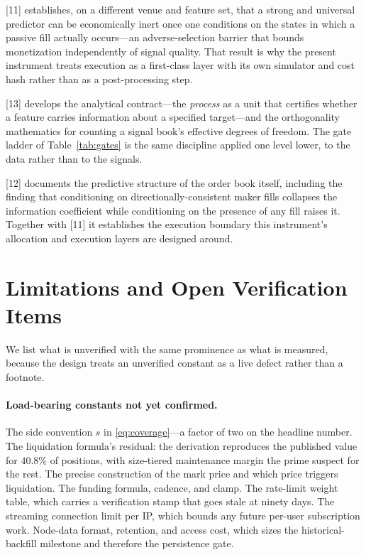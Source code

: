\documentclass[11pt,a4paper]{article}
\theoremstyle{definition}
\theoremstyle{plain}
\begin{document}
[11] establishes, on a different venue and feature set, that a strong and universal predictor
can be economically inert once one conditions on the states in which a passive fill actually
occurs---an adverse-selection barrier that bounds monetization independently of signal quality. That
result is why the present instrument treats execution as a first-class layer with its own simulator
and cost hash rather than as a post-processing step.

[13] develops the analytical contract---the \emph{process} as a unit that certifies whether
a feature carries information about a specified target---and the orthogonality mathematics for
counting a signal book's effective degrees of freedom. The gate ladder of Table~\ref{tab:gates} is
the same discipline applied one level lower, to the data rather than to the signals.

[12] documents the predictive structure of the order book itself, including the finding that
conditioning on directionally-consistent maker fills collapses the information coefficient while
conditioning on the presence of any fill raises it. Together with [11] it establishes the
execution boundary this instrument's allocation and execution layers are designed around.

\section{Limitations and Open Verification Items}
\label{sec:limits}

We list what is unverified with the same prominence as what is measured, because the design treats an
unverified constant as a live defect rather than a footnote.

\paragraph{Load-bearing constants not yet confirmed.} The side convention $s$ in
\eqref{eq:coverage}---a factor of two on the headline number. The liquidation formula's residual: the
derivation reproduces the published value for $40.8\%$ of positions, with size-tiered maintenance
margin the prime suspect for the rest. The precise construction of the mark price and which price
triggers liquidation. The funding formula, cadence, and clamp. The rate-limit weight table, which
carries a verification stamp that goes stale at ninety days. The streaming connection limit per IP,
which bounds any future per-user subscription work. Node-data format, retention, and access cost,
which sizes the historical-backfill milestone and therefore the persistence gate.
\end{document}
